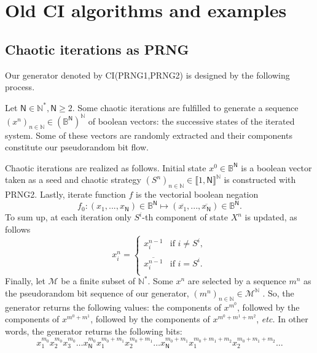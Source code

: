 \section{Old CI algorithms and examples}
\label{Old CI algorithms and examples}
\subsection{Chaotic iterations as PRNG}
\label{subsec Chaotic iterations as PRNG}
Our generator denoted by CI(PRNG1,PRNG2) is designed by the following process. 

Let $\mathsf{N} \in \mathds{N}^*, \mathsf{N} \geqslant 2$. Some chaotic iterations are fulfilled to generate a sequence $\left(x^n\right)_{n\in\mathds{N}} \in \left(\mathds{B}^\mathsf{N}\right)^\mathds{N}$ of boolean vectors: the successive states of the iterated system. Some of these vectors are randomly extracted and their components constitute our pseudorandom bit flow.

Chaotic iterations are realized as follows. Initial state $x^0 \in \mathds{B}^\mathsf{N}$ is a boolean vector taken as a seed and chaotic strategy $\left(S^n\right)_{n\in\mathds{N}}\in \llbracket 1, \mathsf{N} \rrbracket^\mathds{N}$ is constructed with PRNG2. Lastly, iterate function $f$ is the vectorial boolean negation
$$f_0:(x_1,...,x_\mathsf{N}) \in \mathds{B}^\mathsf{N} \longmapsto (\overline{x_1},...,\overline{x_\mathsf{N}}) \in \mathds{B}^\mathsf{N}.$$
To sum up, at each iteration only $S^i$-th component of state $X^n$ is updated, as follows
\begin{equation}
x_i^n = \left\{\begin{array}{ll}x_i^{n-1} & \text{if } i \neq S^i, \\ \\ \overline{x_i^{n-1}} & \text{if } i = S^i. \\\end{array}\right.
\end{equation}
Finally, let $\mathcal{M}$ be a finite subset of $\mathds{N}^*$. Some $x^n$ are selected by a sequence $m^n$ as the pseudorandom bit sequence of our generator, $(m^n)_{n \in \mathds{N}} \in \mathcal{M}^\mathds{N}$ . So, the generator returns the following values: the components of $x^{m^0}$, followed by the components of $x^{m^0+m^1}$, followed by the components of $x^{m^0+m^1+m^2}$, \emph{etc.}
In other words, the generator returns the following bits:\newline
$$x_1^{m_0}x_2^{m_0}x_3^{m_0}\hdots x_\mathsf{N}^{m_0}x_1^{m_0+m_1}x_2^{m_0+m_1}\hdots x_\mathsf{N}^{m_0+m_1} x_1^{m_0+m_1+m_2}x_2^{m_0+m_1+m_2}\hdots$$

